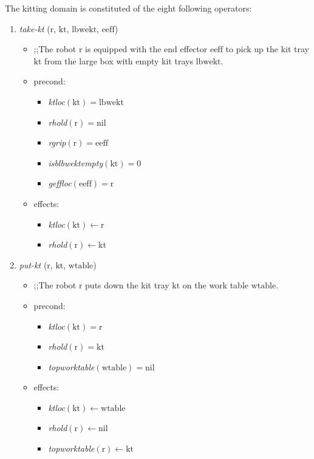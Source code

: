 The kitting domain is constituted of the eight following operators:
\begin{small}
\begin{enumerate}
\item \textsl{take-kt} ($\mathrm{r}$, $\mathrm{kt}$, $\mathrm{lbwekt}$, $\mathrm{eeff}$)
\begin{itemize}
\item ;;The robot $\mathrm{r}$ is equipped with the end effector $\mathrm{eeff}$ to pick up the kit tray $\mathrm{kt}$ from the large box with empty kit trays $\mathrm{lbwekt}$.
\item precond:
\begin{itemize}
\item[]\emph{ktloc}$\mathrm{(kt)=lbwekt}$
\item[]\emph{rhold}$\mathrm{(r)=nil}$
\item[]\emph{rgrip}$\mathrm{(r)=eeff}$
\item[]\emph{isblbwektempty}$\mathrm{(kt)=0}$
\item[]\emph{geffloc}$\mathrm{(eeff)=r}$
\end{itemize}
\item effects:
\begin{itemize}
\item[]\emph{ktloc}$\mathrm{(kt)\leftarrow r}$
\item[]\emph{rhold}$\mathrm{(r)\leftarrow kt}$
\end{itemize}
\end{itemize}

\item \textsl{put-kt} ($\mathrm{r}$, $\mathrm{kt}$, $\mathrm{wtable}$)
\begin{itemize}
\item ;;The robot $\mathrm{r}$ puts down the kit tray $\mathrm{kt}$ on the work table $\mathrm{wtable}$.
\item precond:
\begin{itemize}
\item[]\emph{ktloc}$\mathrm{(kt)=r}$
\item[]\emph{rhold}$\mathrm{(r)=kt}$
\item[]\emph{topworktable}$\mathrm{(wtable)=nil}$
\end{itemize}
\item effects:
\begin{itemize}
\item[]\emph{ktloc}$\mathrm{(kt)\leftarrow wtable}$
\item[]\emph{rhold}$\mathrm{(r)\leftarrow nil}$
\item[]\emph{topworktable}$\mathrm{(r)\leftarrow kt}$
\end{itemize}
\end{itemize}


\end{enumerate}
\end{small}
